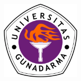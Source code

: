 \begin{titlepage}

\begin{addmargin}[0cm]{-2cm}
\begin{center}
\large

\hfill
\vfill

\begingroup
\color{CeruleanDark}\spacedallcaps{\myTitle} \\
\bigskip
\endgroup

\spacedlowsmallcaps{\myName} %

\vfill

\includegraphics[width=4cm]{include/gunadarma-logo} \\ \medskip %

\vfill

\mySubtitle \\ \medskip %


\vfill

\end{center}
\end{addmargin}

\end{titlepage}

